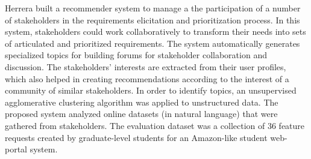 Herrera \etal \cite{Castro-Herrera:2009} built a recommender system to manage a
the participation of a number of stakeholders in the requirements elicitation
and prioritization process. In this system, stakeholders could work
collaboratively to transform their needs into sets of articulated and
prioritized requirements.
The system automatically generates specialized topics for building forums for
stakeholder collaboration and discussion. The stakeholders' interests are
extracted from their user profiles, which also helped in creating
recommendations according to the interest of a community of similar
stakeholders. In order to identify topics, an unsupervised agglomerative
clustering algorithm was applied to unstructured data. The proposed system
analyzed online datasets (in natural language) that were gathered from
stakeholders. The evaluation dataset was a collection of 36 feature requests
created by graduate-level students for an Amazon-like student web-portal system.






